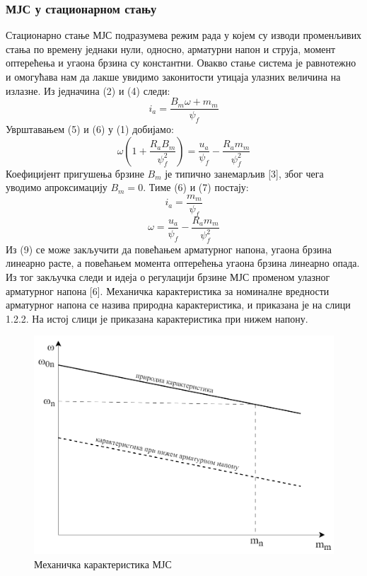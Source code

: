 \documentclass[12pt]{article}
\begin{document}
\subsubsection{МЈС у стационарном стању}
Стационарно стање МЈС подразумева режим рада у којем су изводи променљивих стања по времену једнаки нули, односно, арматурни напон и струја, момент оптерећења и угаона брзина су константни. Овакво стање система је равнотежно и омогућава нам да лакше увидимо законитости утицаја улазних величина на излазне. Из једначина (2) и (4) следи:
\begin{equation}
    i_a=\dfrac{B_m\omega+m_m}{\psi _f}
\end{equation}
Уврштавањем (5) и (6) у (1) добијамо:
\begin{equation}
    \omega(1+\dfrac{R_aB_m}{\psi _f^2})=\dfrac{u_a}{\psi _f}-\dfrac{R_am_m}{\psi _f^2}
\end{equation}
Коефицијент пригушења брзине $B_m$ је типично занемарљив [3], због чега уводимо апроксимацију $B_m=0$. Тиме (6) и (7) постају:
\begin{equation}
    i_a=\dfrac{m_m}{\psi _f}
\end{equation}
\begin{equation}
    \omega=\dfrac{u_a}{\psi _f}-\dfrac{R_am_m}{\psi _f^2}
\end{equation}
Из (9) се може закључити да повећањем арматурног напона, угаона брзина линеарно расте, а повећањем момента оптерећења угаона брзина линеарно опада. Из тог закључка следи и идеја о регулацији брзине МЈС променом улазног арматурног напона [6]. Механичка карактеристика за номиналне вредности арматурног напона се назива природна карактеристика, и приказана је на слици 1.2.2. На истој слици је приказана карактеристика при нижем напону.

\begin{figure}[H]
    \centering
    \includegraphics[width=15cm]{figures/k-ka_bdc.drawio.png}
    \caption{Механичка карактеристика МЈС}
    \label{fig:карактеристика_мјс}
\end{figure}
\end{document}
